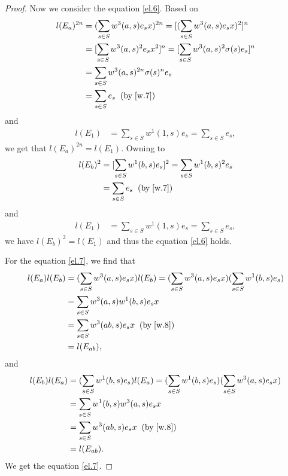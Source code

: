 \documentclass[a4paper,11pt]{amsart}
\numberwithin{equation}{section}
\begin{document}
\begin{proof}
Now we consider the equation \eqref{el.6}. Based on
\begin{align*}
l(E_a)^{2n}&=(\sum\limits_{s \in S}w^3(a,s)e_s x)^{2n}=[(\sum\limits_{s \in S}w^3(a,s)e_s x)^2]^{n}\\
&=[\sum\limits_{s \in S}w^3(a,s)^2 e_s x^2]^{n}=[\sum\limits_{s \in S}w^3(a,s)^2 \sigma(s) e_s]^{n}\\
&=\sum\limits_{s \in S}w^3(a,s)^{2n} \sigma(s)^n e_s\\
&=\sum\limits_{s \in S}e_s \;\;(\text{by}\;\eqref{w.7})
\end{align*}
and
\begin{align*}
l(E_1)&=\sum\limits_{s \in S} w^1(1,s)e_s=\sum\limits_{s \in S} e_s,
\end{align*}
we get that $l(E_{a})^{2n}=l(E_1)$. Owning to
\begin{align*}
l(E_b)^{2}&=[\sum\limits_{s \in S}w^1(b,s)e_s]^{2}=\sum\limits_{s \in S}w^1(b,s)^2e_s\\
&=\sum\limits_{s \in S}e_s \;\;(\text{by}\;\eqref{w.7})
\end{align*}
and
\begin{align*}
l(E_1)&=\sum\limits_{s \in S} w^1(1,s)e_s=\sum\limits_{s \in S} e_s,
\end{align*}
we have $l(E_{b})^{2}=l(E_1)$ and thus the equation \eqref{el.6} holds.

For the equation \eqref{el.7}, we find that
\begin{align*}
l(E_a)l(E_b)&=(\sum\limits_{s \in S}w^3(a,s)e_s x) l(E_b)=(\sum\limits_{s \in S}w^3(a,s)e_s x) (\sum\limits_{s \in S}w^1(b,s)e_s)\\
&=\sum\limits_{s \in S}w^3(a,s) w^1(b,s)e_s x\\
&=\sum\limits_{s \in S}w^3(ab,s) e_s x \;\;(\text{by}\;\eqref{w.8})\\
&=l(E_{ab}),
\end{align*}
and
\begin{align*}
l(E_b)l(E_a)&=(\sum\limits_{s \in S}w^1(b,s)e_s) l(E_a)=(\sum\limits_{s \in S}w^1(b,s)e_s) (\sum\limits_{s \in S}w^3(a,s)e_s x)\\
&=\sum\limits_{s \in S}w^1(b,s) w^3(a,s) e_s x\\
&=\sum\limits_{s \in S}w^3(ab,s) e_s x \;\;(\text{by}\;\eqref{w.8})\\
&=l(E_{ab}).
\end{align*}
We get the equation \eqref{el.7}.


\end{proof}
\end{document}
